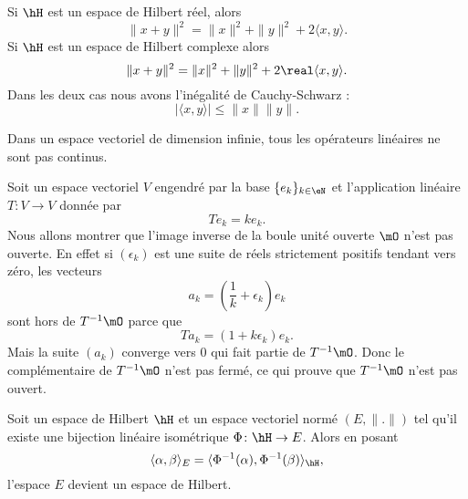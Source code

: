 \begin{proposition}     \label{PropTdupIG}
    Si \( \hH\) est un espace de Hilbert réel, alors
    \begin{equation}
        \| x+y \|^2=\| x \|^2+\| y \|^2+2\langle x, y\rangle .
    \end{equation}
    Si \( \hH\) est un espace de Hilbert complexe alors
    \begin{equation}        \label{EqrbBlkK}
        \| x+y \|^2=\| x \|^2+\| y \|^2+2\real\langle x, y\rangle .
    \end{equation}
    Dans les deux cas nous avons l'inégalité de Cauchy-Schwarz :
    \begin{equation}
        | \langle x, y\rangle  |\leq \| x \|\| y \|.
    \end{equation}
\end{proposition}

Dans un espace vectoriel de dimension infinie, tous les opérateurs linéaires ne sont pas continus.

\begin{example}
    Soit un espace vectoriel \( V\) engendré par la base \( \{ e_k \}_{k\in \eN}\) et l'application linéaire \( T\colon V\to V\) donnée par
    \begin{equation}
        Te_k=ke_k.
    \end{equation}
    Nous allons montrer que l'image inverse de la boule unité ouverte \( \mO\) n'est pas ouverte. En effet si \( (\epsilon_k)\) est une suite de réels strictement positifs tendant vers zéro, les vecteurs
    \begin{equation}
        a_k=\left( \frac{1}{ k }+\epsilon_k \right)e_k
    \end{equation}
    sont hors de \( T^{-1}\mO\) parce que
    \begin{equation}
        Ta_k=(1+k\epsilon_k)e_k.
    \end{equation}
    Mais la suite \( (a_k)\) converge vers \( 0\) qui fait partie de \( T^{-1}\mO\). Donc le complémentaire de \( T^{-1}\mO\) n'est pas fermé, ce qui prouve que \( T^{-1}\mO\) n'est pas ouvert.
\end{example}

\begin{proposition}      \label{PROPooMSAYooONHLYq}
    Soit un espace de Hilbert \( \hH\) et un espace vectoriel normé \( (E,\| . \|)\) tel qu'il existe une bijection linéaire isométrique \( \Phi\colon \hH\to E\). Alors en posant
    \begin{equation}
        \langle \alpha, \beta\rangle_E =\langle \Phi^{-1}(\alpha), \Phi^{-1}(\beta)\rangle_{\hH} ,
    \end{equation}
    l'espace \( E\) devient un espace de Hilbert.
\end{proposition}

